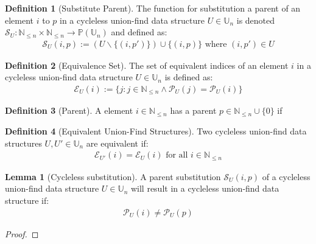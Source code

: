 \documentclass[a4paper,12pt]{article}
\theoremstyle{definition}
\newtheorem{definition}{Definition}[section]
\newtheorem{lemma}{Lemma}[section]
\begin{document}
\begin{definition}[Substitute Parent]
    The function for substitution a parent of an element $i$ to $p$ in a
    cycleless union-find data structure $U \in \mathbb{U}_n$ is denoted
    $\mathcal{S}_U : \mathbb{N}_{\leq n} \times \mathbb{N}_{\leq n} \to
    \mathbb{P}(\mathbb{U}_n)$ and defined as:
    \begin{align*}
        \mathcal{S}_U(i, p) := (U \backslash \{(i, p')\}) \cup \{(i, p)\} \text{ where } (i, p') \in U
    \end{align*}
\end{definition}

\begin{definition}[Equivalence Set]
    The set of equivalent indices of an element $i$ in a cycleless union-find
    data structure $U \in \mathbb{U}_n$ is defined as:
    \begin{align*}
        \mathcal{E}_U(i) := \{j : j \in \mathbb{N}_{\leq n} \land \mathcal{P}_U(j) = \mathcal{P}_U(i)\}
    \end{align*}
\end{definition}

\begin{definition}[Parent]
    A element $i \in \mathbb{N}_{\leq n}$ has a parent $p \in \mathbb{N}_{\leq n} 
    \cup \{0\}$ if 
\end{definition}

\begin{definition}[Equivalent Union-Find Structures]
    Two cycleless union-find data structures $U, U' \in \mathbb{U}_n$ are
    equivalent if:
    \begin{align*}
        \mathcal{E}_{U'}(i) = \mathcal{E}_U(i) \text{ for all } i \in \mathbb{N}_{\leq n}
    \end{align*}
\end{definition}
\begin{lemma}[Cycleless substitution]
    A parent substitution $\mathcal{S}_U(i, p)$ of a cycleless union-find
    data structure $U \in \mathbb{U}_n$ will result in a cycleless union-find
    data structure if:
    \begin{align*}
        \mathcal{P}_U(i) \neq \mathcal{P}_U(p)
    \end{align*} 
\end{lemma}
\begin{proof}
    
\end{proof}
\end{document}

